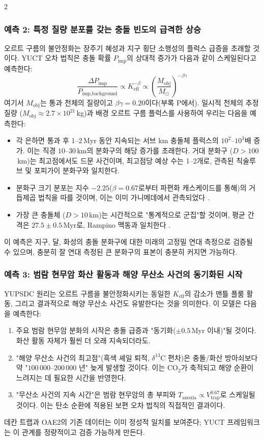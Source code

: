 \documentclass[12pt,a4paper]{article}
\begin{document}
\begin{multicols}{2}
		\subsubsection{예측 2: 특정 질량 분포를 갖는 충돌 빈도의 급격한 상승}
		오르트 구름의 불안정화는 장주기 혜성과 지구 횡단 소행성의 플럭스 급증을 초래할 것이다. YUCT 오차 법칙은 충돌 확률 \(P_{\text{imp}}\)의 상대적 증가가 다음과 같이 스케일된다고 예측한다:
		\[
		\frac{\Delta P_{\text{imp}}}{P_{\text{imp,background}}} \propto K_{\mathrm{eff}}^{-\beta} \propto \left(\frac{M_{\text{obj}}}{M_{\odot}}\right)^{-\beta\gamma}
		\]
		여기서 \(M_{\text{obj}}\)는 통과 천체의 질량이고 \(\beta\gamma = 0.20\)이다(부록 P에서). 일시적 천체의 추정 질량 (\(M_{\text{obj}} \approx 2.7\times10^{21}\) kg)과 배경 오르트 구름 플럭스를 사용하여 우리는 다음을 예측한다:
		\begin{itemize}
			\item 각 은하면 통과 후 1–2 Myr 동안 지속되는 서브 km 충돌체 플럭스의 \(10^{2}\)–\(10^{3}\)배 증가. 이는 직경 \(10\)–\(30\) km의 분화구의 해당 증가를 초래한다. 거대 분화구 (\(D>100\) km)는 최고점에서도 드문 사건이며, 최고점당 예상 수는 1–2개로, 관측된 칙술루브 및 포피가이 분화구와 일치한다.
			\item 분화구 크기 분포는 지수 \(-2.25\)(\(\beta=0.67\)로부터 파편화 캐스케이드를 통해)의 거듭제곱 법칙을 따를 것이며, 이는 이미 가니메데에서 관측되었다 \cite{Schenk2004}.
			\item 가장 큰 충돌체 (\(D>10\) km)는 시간적으로 "통계적으로 군집"할 것이며, 평균 간격은 \(27.5 \pm 0.5\) Myr로, Rampino 맥동과 일치한다 \cite{Rampino2021}.
		\end{itemize}
		이 예측은 지구, 달, 화성의 충돌 분화구에 대한 미래의 고정밀 연대 측정으로 검증될 수 있으며, 충분히 잘 연대 측정된 큰 분화구의 표본이 충분히 커지면 가능하다.
		
		\subsubsection{예측 3: 범람 현무암 화산 활동과 해양 무산소 사건의 동기화된 시작}
		YUPSDC 원리는 오르트 구름을 불안정화시키는 동일한 \(K_{\mathrm{eff}}\)의 감소가 맨틀 플룸 활동, 그리고 결과적으로 해양 무산소 사건도 유발한다는 것을 의미한다. 이 모델은 다음을 예측한다:
		\begin{enumerate}
			\item 주요 범람 현무암 분화의 시작은 충돌 급증과 "동기화(\(\pm 0.5\) Myr 이내)"될 것이다. 화산 활동 자체가 훨씬 더 오래 지속되더라도.
			\item "해양 무산소 사건의 최고점"(흑색 셰일 퇴적, \(\delta^{13}\)C 편차)은 충돌/화산 방아쇠보다 약 "\(100\,000\)–\(200\,000\) 년" 늦게 발생할 것이다. 이는 CO\(_2\)가 축적되고 해양 순환이 느려지는 데 필요한 시간을 반영한다.
			\item "무산소 사건의 지속 시간"은 범람 현무암의 총 부피와 \(T_{\text{anoxia}} \propto V_{\text{trap}}^{0.67}\)로 스케일될 것이다. 이는 탄소 순환에 적용된 보편 오차 법칙의 직접적인 결과이다.
		\end{enumerate}
		데칸 트랩과 OAE2의 기존 데이터는 이미 정성적 일치를 보여준다; YUCT 프레임워크는 이 관계를 정량적이고 검증 가능하게 만든다.
		

\end{multicols}
\end{document}
